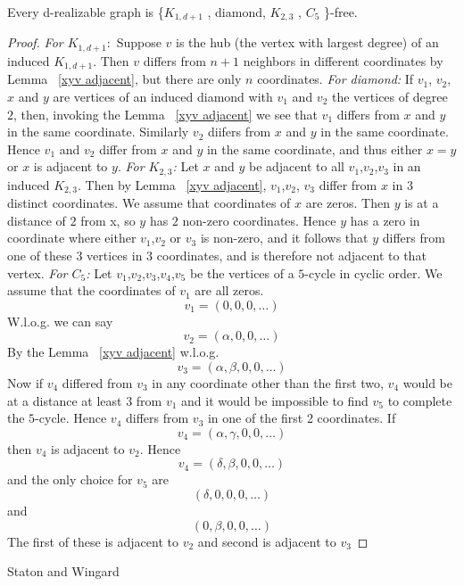 \documentclass[12pt,a4paper,titlepage,openany]{report}
\begin{document}
\begin{theorem}
Every d-realizable graph is \{$K_{1,d+1}$ , diamond,
$K_{2,3}$ , $C_5$ \}-free.
\end{theorem} 
\begin{proof}
\textit{For $K_{1,d+1}:$} Suppose $v$ is the hub (the vertex with largest degree) of an induced $K_{1,d+1}$. Then $v$ differs from $n+1$ neighbors in different coordinates by Lemma ~\ref{xyv adjacent}, but there are only $n$ coordinates.\newline
\textit{For diamond:} If $v_1$, $v_2$, $x$ and $y$ are vertices of an induced diamond with $v_1$ and $v_2$ the vertices of degree $2$, then, invoking the Lemma ~\ref{xyv adjacent} we see that $v_1$ differs from $x$ and $y$ in the same coordinate. Similarly $v_2$ diifers from $x$ and $y$ in the same coordinate. Hence $v_1$ and $v_2$ differ from $x$ and $y$ in the same coordinate, and thus either $x=y$ or $x$ is adjacent to $y$.\newline
\textit{For $K_{2,3}$:} Let $x$ and $y$ be adjacent to all $v_1$,$v_2$,$v_3$ in an induced $K_{2,3}$. Then by Lemma ~\ref{xyv adjacent}, $v_1$,$v_2$, $v_3$ differ from $x$ in $3$ distinct coordinates. We assume that coordinates of $x$ are zeros. Then $y$ is at a distance of $2$ from x, so $y$ has $2$ non-zero coordinates. Hence $y$ has a zero in coordinate where either $v_1$,$v_2$ or $v_3$ is non-zero, and it follows that $y$ differs from one of these $3$ vertices in $3$ coordinates, and is therefore not adjacent to that vertex.\newline
\textit{For $C_5$:} Let $v_1$,$v_2$,$v_3$,$v_4$,$v_5$ be the vertices of a $5$-cycle in cyclic order. We assume that the coordinates of $v_1$ are all zeros.
$$v_1=(0,0,0,\ldots)$$
W.l.o.g. we can say
$$v_2=(\alpha,0,0,\ldots)$$
By the Lemma ~\ref{xyv adjacent} w.l.o.g.
$$v_3=(\alpha,\beta,0,0,\ldots)$$
Now if $v_4$ differed from $v_3$ in any coordinate other than the first two, $v_4$ would be at a distance at least $3$ from $v_1$ and it would be impossible to find $v_5$ to complete the $5$-cycle. Hence $v_4$ differs from $v_3$ in one of the first 2 coordinates. If 
$$v_4=(\alpha,\gamma,0,0,\ldots)$$
then $v_4$ is adjacent to $v_2$. Hence
$$v_4=(\delta,\beta,0,0,\ldots)$$
and the only choice for $v_5$ are
$$(\delta,0,0,0,\ldots)$$
and 
$$(0,\beta,0,0,\ldots)$$
The first of these is adjacent to $v_2$ and second is adjacent to $v_3$
 
\end{proof}

Staton and Wingard
\end{document}
